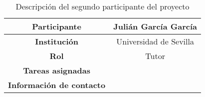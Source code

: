 \begin{table}[H]
    \centering
    \begin{tabular}{|c|c|}
    \hline
    \textbf{Participante} & Julián García García \\
    \hline
    \textbf{Institución} & Universidad de Sevilla \\
    \hline
    \textbf{Rol} & Tutor \\
    \hline
    \textbf{Tareas asignadas} & \\
    \hline
    \textbf{Información de contacto} & \\
    \hline
    \end{tabular}
\caption{Descripción del segundo participante del proyecto}
\label{tab:segundoParticipante}
\end{table}